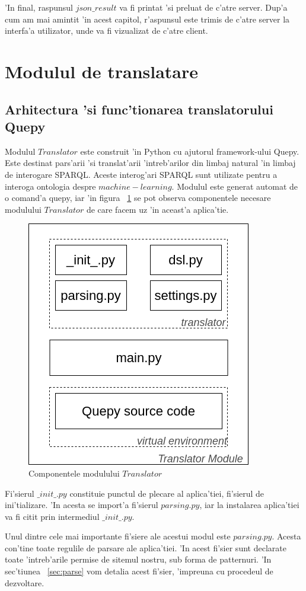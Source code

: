 \documentclass[12pt,a4paper,twoside]{report}
\begin{document}
'In final, raspunsul $json\_result$ va fi printat 'si preluat de c'atre server. Dup'a cum am mai amintit 'in acest capitol, r'aspunsul este trimis de c'atre server la interfa'a utilizator, unde va fi vizualizat de c'atre client.


\section{Modulul de translatare}
\subsection{Arhitectura 'si func'tionarea translatorului Quepy}

Modulul $Translator$ este construit 'in Python cu ajutorul framework-ului Quepy. Este destinat pars'arii 'si translat'arii 'intreb'arilor din limbaj natural 'in limbaj de interogare SPARQL. Aceste interog'ari SPARQL sunt utilizate pentru a interoga ontologia despre $machine-learning$. Modulul este generat automat de o comand'a quepy, iar 'in figura ~\ref{fig:quepy_files} se pot observa componentele necesare modulului $Translator$ de care facem uz 'in aceast'a aplica'tie. 
\begin{figure}
    \centering
    \includegraphics[width = 0.5\linewidth]{img/quepy_schema.png}
    \caption{Componentele modulului $Translator$}
    \label{fig:quepy_files}
\end{figure}

Fi'sierul $\_init\_.py$ constituie punctul de plecare al aplica'tiei, fi'sierul de ini'tializare. 'In acesta se import'a fi'sierul $parsing.py$, iar la instalarea aplica'tiei va fi citit prin intermediul $\_init\_.py$. 

Unul dintre cele mai importante fi'siere ale acestui modul este $parsing.py$. Acesta con'tine toate regulile de parsare ale aplica'tiei. 'In acest fi'sier sunt declarate toate 'intreb'arile permise de sitemul nostru, sub forma de patternuri. 'In sec'tiunea ~\ref{sec:parse} vom detalia acest fi'sier, 'impreuna cu procedeul de dezvoltare.
\end{document}
